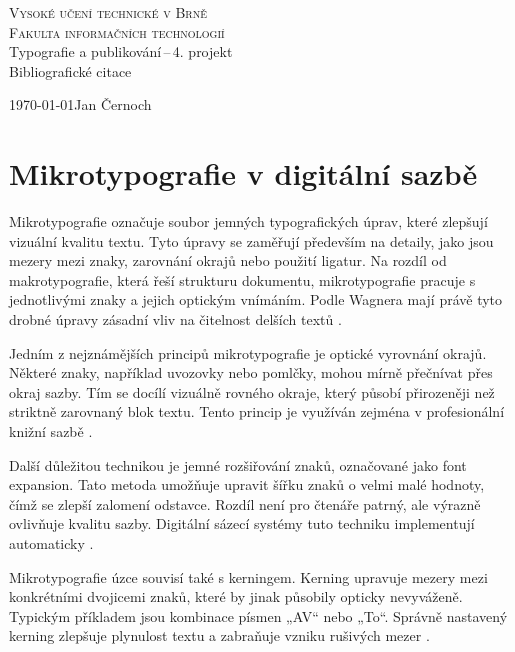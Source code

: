 \documentclass[a4paper,11pt]{article}
\begin{document}
    \begin{titlepage}
        \begin{center}
            \textsc{\Huge{Vysoké učení technické v Brně}} \\
            \vspace{0.5 em}
            \textsc{\huge{Fakulta informačních technologií}} \\
            \LARGE{Typografie a publikování\,--\,4. projekt} \\
            \Huge{Bibliografické citace}
        \end{center}
        \Large{\today \hfill Jan Černoch}
    \end{titlepage}

\clearpage
\section*{Mikrotypografie v digitální sazbě}

Mikrotypografie označuje soubor jemných typografických úprav, které zlepšují vizuální kvalitu textu. 
Tyto úpravy se zaměřují především na detaily, jako jsou mezery mezi znaky, zarovnání okrajů nebo použití ligatur. 
Na rozdíl od makrotypografie, která řeší strukturu dokumentu, mikrotypografie pracuje s jednotlivými znaky a jejich optickým vnímáním. 
Podle Wagnera mají právě tyto drobné úpravy zásadní vliv na čitelnost delších textů \cite{wagner}. 

Jedním z nejznámějších principů mikrotypografie je optické vyrovnání okrajů. 
Některé znaky, například uvozovky nebo pomlčky, mohou mírně přečnívat přes okraj sazby. 
Tím se docílí vizuálně rovného okraje, který působí přirozeněji než striktně zarovnaný blok textu. 
Tento princip je využíván zejména v profesionální knižní sazbě \cite{bringhurst}. 

Další důležitou technikou je jemné rozšiřování znaků, označované jako font expansion. 
Tato metoda umožňuje upravit šířku znaků o velmi malé hodnoty, čímž se zlepší zalomení odstavce. 
Rozdíl není pro čtenáře patrný, ale výrazně ovlivňuje kvalitu sazby. 
Digitální sázecí systémy tuto techniku implementují automaticky \cite{microtype}. 

Mikrotypografie úzce souvisí také s kerningem. 
Kerning upravuje mezery mezi konkrétními dvojicemi znaků, které by jinak působily opticky nevyváženě. 
Typickým příkladem jsou kombinace písmen „AV“ nebo „To“. 
Správně nastavený kerning zlepšuje plynulost textu a zabraňuje vzniku rušivých mezer \cite{root}. 
\end{document}
